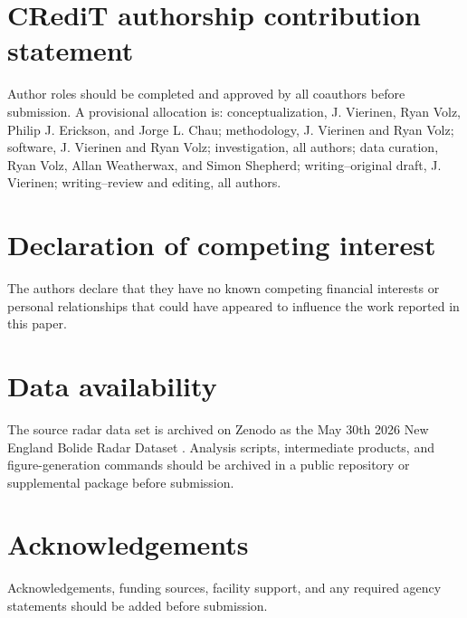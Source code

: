 \documentclass[a4paper,fleqn,longmktitle]{cas-sc}
\begin{document}
\section*{CRediT authorship contribution statement}
Author roles should be completed and approved by all coauthors before
submission. A provisional allocation is: conceptualization, J. Vierinen, Ryan
Volz, Philip J. Erickson, and Jorge L. Chau; methodology, J. Vierinen and Ryan
Volz; software, J. Vierinen and Ryan Volz; investigation, all authors; data
curation, Ryan Volz, Allan Weatherwax, and Simon Shepherd; writing--original
draft, J. Vierinen; writing--review and editing, all authors.

\section*{Declaration of competing interest}
The authors declare that they have no known competing financial interests or
personal relationships that could have appeared to influence the work reported
in this paper.

\section*{Data availability}
The source radar data set is archived on Zenodo as the May 30th 2026 New
England Bolide Radar Dataset \cite{volz_2026_20507006}. Analysis scripts,
intermediate products, and figure-generation commands should be archived in a
public repository or supplemental package before submission.

\section*{Acknowledgements}
Acknowledgements, funding sources, facility support, and any required agency
statements should be added before submission.



\end{document}
